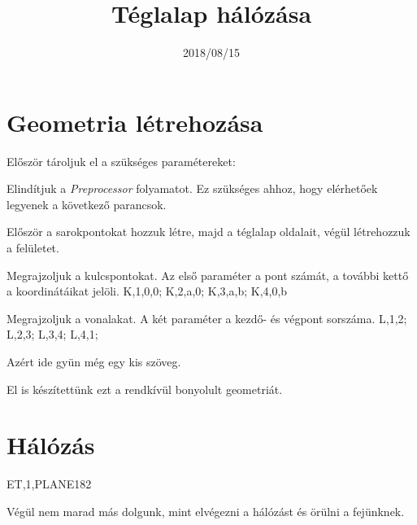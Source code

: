 \documentclass[magyar]{apdl}
\begin{document}

\title{Téglalap hálózása}
\date{2018/08/15}

\maketitle


\section{Geometria létrehozása}

Először tároljuk el a szükséges paramétereket:




Elindítjuk a \emph{Preprocessor} folyamatot. Ez szükséges ahhoz, hogy elérhetőek legyenek a következő parancsok.


Először a sarokpontokat hozzuk létre, majd a téglalap oldalait, végül létrehozzuk a felületet.

\ccode{4cm}
{Megrajzoljuk a kulcspontokat. Az első paraméter a pont számát, a további kettő a koordinátáikat jelöli.}
{
K,1,0,0; 
K,2,a,0;
K,3,a,b;
K,4,0,b
}

\ccode{4cm}
{Megrajzoljuk a vonalakat. A két paraméter a kezdő- és végpont sorszáma.}
{
L,1,2;
L,2,3;
L,3,4;
L,4,1;
}

Azért ide gyün még egy kis szöveg.


El is készítettünk ezt a rendkívül bonyolult geometriát.

\section{Hálózás}

{ET,1,PLANE182}



Végül nem marad más dolgunk, mint elvégezni a hálózást és örülni a fejünknek.

\end{document}
